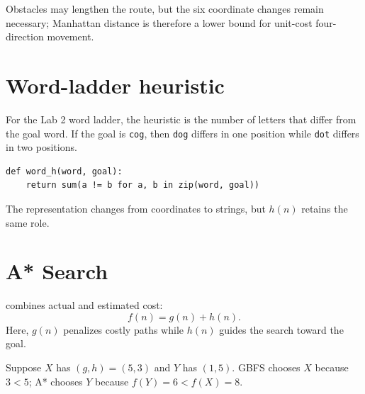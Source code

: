 \begin{mlfigure}
\end{mlfigure}

Obstacles may lengthen the route, but the six coordinate changes remain necessary; Manhattan distance is therefore a lower bound for unit-cost four-direction movement.

\section{Word-ladder heuristic}

For the Lab 2 word ladder, the heuristic is the number of letters that differ from the goal word. If the goal is \texttt{cog}, then \texttt{dog} differs in one position while \texttt{dot} differs in two positions.

\begin{lstlisting}[style=mlpython]
def word_h(word, goal):
    return sum(a != b for a, b in zip(word, goal))
\end{lstlisting}

The representation changes from coordinates to strings, but \(h(n)\) retains the same role.

\section{A* Search}

 combines actual and estimated cost:
\[
f(n)=g(n)+h(n).
\]
Here, \(g(n)\) penalizes costly paths while \(h(n)\) guides the search toward the goal.

\begin{workedexample}
Suppose \(X\) has \((g,h)=(5,3)\) and \(Y\) has \((1,5)\). GBFS chooses \(X\) because \(3<5\); A* chooses \(Y\) because \(f(Y)=6<f(X)=8\).
\end{workedexample}

